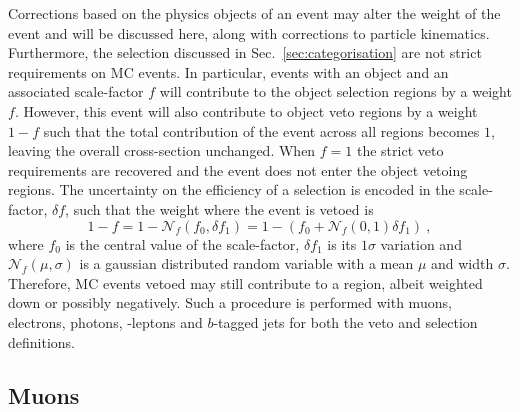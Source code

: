 Corrections based on the physics objects of an event may alter the weight of the event and will be discussed here, along with corrections to particle kinematics. Furthermore, the selection discussed in Sec.~\ref{sec:categorisation} are not strict requirements on MC events. In particular, events with an object and an associated scale-factor $f$ will contribute to the object selection regions by a weight $f$. However, this event will also contribute to object veto regions by a weight $1-f$ such that the total contribution of the event across all regions becomes $1$, leaving the overall cross-section unchanged. When $f=1$ the strict veto requirements are recovered and the event does not enter the object vetoing regions. The uncertainty on the efficiency of a selection is encoded in the scale-factor, $\delta f$, such that the weight where the event is vetoed is
%
\begin{equation}
    1 - f = 1 - \mathcal{N}_f(f_0,\delta f_1) = 1 - (f_0 + \mathcal{N}_f(0,1)\delta f_1)\ ,
\end{equation}
%
where $f_0$ is the central value of the scale-factor, $\delta f_1$ is its
$1\sigma$ variation and $\mathcal{N}_f(\mu,\sigma)$ is a gaussian distributed
random variable with a mean $\mu$ and width $\sigma$. Therefore, MC events
vetoed may still contribute to a region, albeit weighted down or possibly
negatively. Such a procedure is performed with muons, electrons, photons,
\Ptauh-leptons and $b$-tagged jets for both the veto and selection definitions.


\subsection{Muons}

